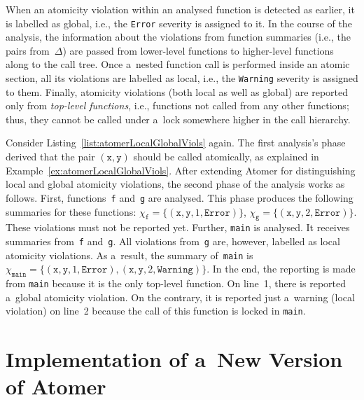 When an atomicity violation within an analysed function is detected as earlier, it is labelled as global, i.e., the \texttt{Error} severity is assigned to it. In the course of the analysis, the information about the violations from function summaries (i.e., the pairs from~$ \Delta $) are passed from lower-level functions to higher-level functions along to the call tree. Once a~nested function call is performed inside an atomic section, all its violations are labelled as local, i.e., the \texttt{Warning} severity is assigned to them. Finally, atomicity violations (both local as well as global) are reported only from \emph{top-level functions}, i.e., functions not called from any other functions; thus, they cannot be called under a~lock somewhere higher in the call hierarchy.

\begin{example}
    Consider Listing~\ref{list:atomerLocalGlobalViols} again. The first analysis's phase derived that the pair $ (\mathtt{x}, \mathtt{y}) $ should be called atomically, as explained in Example~\ref{ex:atomerLocalGlobalViols}. After extending Atomer for distinguishing local and global atomicity violations, the second phase of the analysis works as follows. First, functions~\texttt{f} and~\texttt{g} are analysed. This phase produces the following summaries for these functions: $ \chi_\mathtt{f} = \{(\mathtt{x}, \mathtt{y}, 1, \mathtt{Error})\} $, $ \chi_\mathtt{g} = \{(\mathtt{x}, \mathtt{y}, 2, \mathtt{Error})\} $. These violations must not be reported yet. Further, \texttt{main} is analysed. It receives summaries from~\texttt{f} and~\texttt{g}. All violations from~\texttt{g} are, however, labelled as local atomicity violations. As a~result, the summary of~\texttt{main} is $ \chi_\mathtt{main} = \{(\mathtt{x}, \mathtt{y}, 1, \mathtt{Error}), (\mathtt{x}, \mathtt{y}, 2, \mathtt{Warning})\} $. In the end, the reporting is made from \texttt{main} because it is the only top-level function. On line~1, there is reported a~global atomicity violation. On the contrary, it is reported just a~warning (local violation) on line~2 because the call of this function is locked in \texttt{main}.
\end{example}






\chapter{Implementation of a~New Version of Atomer}
\label{chap:implement}


